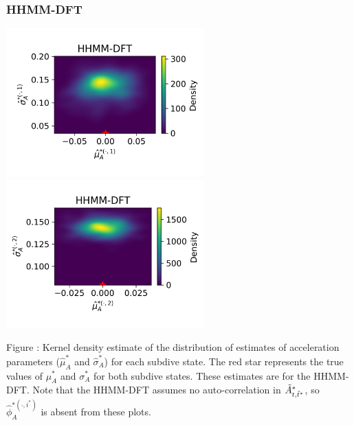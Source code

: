 \documentclass{article}
\begin{document}
        \subsubsection{HHMM-DFT}
        \begin{center}
        \includegraphics[width=3in]{../Plots/hhmm_FV_uncorr_MLE_density_A_0_0.png}
        \includegraphics[width=3in]{../Plots/hhmm_FV_uncorr_MLE_density_A_0_1.png}
        \end{center}
        
        \noindent Figure : Kernel density estimate of the distribution of estimates of acceleration parameters ($\hat \mu^*_A$ and $\hat \sigma^*_A$) for each subdive state. The red star represents the true values of $\mu^*_A$ and $\sigma^*_A$ for both subdive states. These estimates are for the HHMM-DFT. Note that the HHMM-DFT assumes no auto-correlation in $\tilde{A}^*_{t,\tilde t^*}$, so $\hat \phi_A^{*(\cdot,i^*)}$ is absent from these plots.
        \addtocounter{fignum}{1}
        
\end{document}
